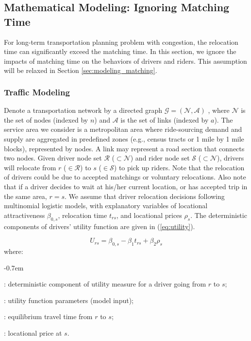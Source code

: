 \documentclass[review]{elsarticle}
\begin{document}
\subsection{Mathematical Modeling: Ignoring Matching Time}

For long-term transportation planning problem with congestion, the relocation time can significantly exceed the matching time. In this section, we ignore the impacts of matching time on the behaviors of drivers and riders. This assumption will be relaxed in Section \ref{sec:modeling_matching}.

\subsubsection{Traffic Modeling}
Denote a transportation network by a directed graph $\mathcal{G} = (\mathcal{N}, \mathcal{A})$ , where $\mathcal{N}$  is the set of nodes (indexed by $n$) and  $\mathcal{A}$ is the set of links (indexed by $a$).  The service area we consider is a metropolitan area where ride-sourcing demand and supply are aggregated in predefined zones (e.g., census tracts or 1 mile by 1 mile blocks), represented by nodes.  A link may represent a road section that connects two nodes. Given driver node set $\mathcal{R}$ ($\subset \mathcal{N}$) and rider node set $\mathcal{S}$ ($\subset \mathcal{N}$), drivers will relocate from $r$ ($\in \mathcal{R}$) to $s$ ($\in \mathcal{S}$) to pick up riders. Note that the relocation of drivers could be due to accepted matchings or voluntary relocations. Also note that if a driver decides to wait at his/her current location, or has accepted trip in the same area, $r = s$.  We assume that driver relocation decisions following multinomial logistic models, with explanatory variables of locational attractiveness $\beta_{0,s}$, relocation time $t_{rs}$, and locational prices $\rho_s$. The deterministic components of drivers' utility function are given in (\ref{eq:utility}).

\begin{equation}
\label{eq:utility}
U_{rs} = \beta_{0,s} -\beta_1 t_{rs} + \beta_2 \rho_{s}
\end{equation}
where: 
\begin{description}[leftmargin=!,labelwidth=\widthof{12345}]
	\itemsep-0.7em 
	\item[$U_{rs}$]: deterministic component of utility measure for a driver going from $r$ to $s$;
	\item[$\beta$] : utility function parameters (model input);
	\item[$t_{rs}$] : equilibrium travel time from $r$ to $s$; 
	\item[$\rho_{s}$] : locational price at $s$.
\end{description}
\end{document}
